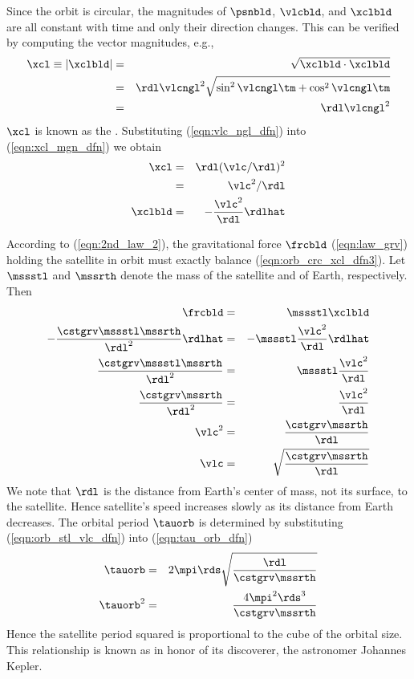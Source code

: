 \documentclass[12pt]{article}
\begin{document}
Since the orbit is circular, the magnitudes of $\psnbld$, $\vlcbld$,
and $\xclbld$ are all constant with time and only their direction
changes. 
This can be verified by computing the vector magnitudes, e.g., 
\begin{eqnarray}
\xcl \equiv |\xclbld| & = & \sqrt{\xclbld \cdot \xclbld} \nonumber \\
& = & \rdl \vlcngl^{2} \sqrt{\sin^{2} \vlcngl \tm + \cos^{2} \vlcngl \tm} \nonumber \\
& = & \rdl \vlcngl^{2}
\label{eqn:xcl_mgn_dfn}
\end{eqnarray}
$\xcl$ is known as the .
Substituting (\ref{eqn:vlc_ngl_dfn}) into (\ref{eqn:xcl_mgn_dfn})
we obtain 
\begin{eqnarray}
\xcl & = & \rdl (\vlc / \rdl)^{2} \nonumber \\
& = & \vlc^{2} / \rdl \nonumber \\
\xclbld & = & - \frac{\vlc^{2}}{\rdl} \rdlhat
\label{eqn:orb_crc_xcl_dfn3}
\end{eqnarray}

According to  (\ref{eqn:2nd_law_2}), the
gravitational force $\frcbld$ (\ref{eqn:law_grv}) holding the
satellite in orbit must exactly balance (\ref{eqn:orb_crc_xcl_dfn3}). 
Let $\mssstl$ and $\mssrth$ denote the mass of the satellite and of
Earth, respectively.
Then
\begin{eqnarray}
\frcbld & = & \mssstl \xclbld  \nonumber \\
- \frac{\cstgrv \mssstl \mssrth}{\rdl^{2}} \rdlhat & = & - \mssstl \frac{\vlc^{2}}{\rdl} \rdlhat \nonumber \\
\frac{\cstgrv \mssstl \mssrth}{\rdl^{2}} & = & \mssstl \frac{\vlc^{2}}{\rdl} \nonumber \\
\frac{\cstgrv \mssrth}{\rdl^{2}} & = & \frac{\vlc^{2}}{\rdl} \nonumber \\
\vlc^{2} & = & \frac{\cstgrv \mssrth}{\rdl} \nonumber \\
\vlc & = & \sqrt{ \frac{\cstgrv \mssrth}{\rdl} }
\label{eqn:orb_stl_vlc_dfn}
\end{eqnarray}
We note that $\rdl$ is the distance from Earth's center of mass,
not its surface, to the satellite. 
Hence  satellite's speed increases slowly as its distance from
Earth decreases.
The orbital period $\tauorb$ is determined by substituting
(\ref{eqn:orb_stl_vlc_dfn}) into (\ref{eqn:tau_orb_dfn}) 
\begin{eqnarray}
\tauorb & = & 2 \mpi \rds \sqrt \frac{\rdl}{\cstgrv \mssrth} \nonumber \\
\tauorb^{2} & = & \frac{4 \mpi^{2} \rds^{3}}{\cstgrv \mssrth}
\label{eqn:orb_stl_vlc_dfn2}
\end{eqnarray}
Hence the satellite period squared is proportional to the cube of the
orbital size.
This relationship is known as  in honor of
its discoverer, the astronomer Johannes Kepler.
\end{document}
